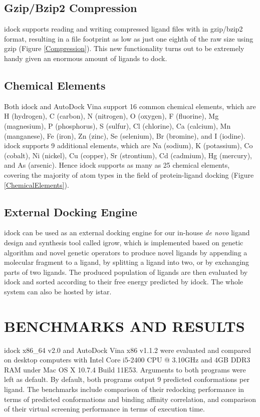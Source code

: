 \documentclass[12pt]{article}
\begin{document}
\subsection*{\sffamily \large Gzip/Bzip2 Compression}

idock supports reading and writing compressed ligand files with in gzip/bzip2 format, resulting in a file footprint as low as just one eighth of the raw size using gzip (Figure \ref{Compression}). This new functionality turns out to be extremely handy given an enormous amount of ligands to dock.

\subsection*{\sffamily \large Chemical Elements}

Both idock and AutoDock Vina support 16 common chemical elements, which are H (hydrogen), C (carbon), N (nitrogen), O (oxygen), F (fluorine), Mg (magnesium), P (phosphorus), S (sulfur), Cl (chlorine), Ca (calcium), Mn (manganese), Fe (iron), Zn (zinc), Se (selenium), Br (bromine), and I (iodine). idock supports 9 additional elements, which are Na (sodium), K (potassium), Co (cobalt), Ni (nickel), Cu (copper), Sr (strontium), Cd (cadmium), Hg (mercury), and As (arsenic). Hence idock supports as many as 25 chemical elements, covering the majority of atom types in the field of protein-ligand docking (Figure \ref{ChemicalElements}).

\subsection*{\sffamily \large External Docking Engine}

idock can be used as an external docking engine for our in-house \textit{de novo} ligand design and synthesis tool called igrow, which is implemented based on genetic algorithm and novel genetic operators to produce novel ligands by appending a molecular fragment to a ligand, by splitting a ligand into two, or by exchanging parts of two ligands. The produced population of ligands are then evaluated by idock and sorted according to their free energy predicted by idock. The whole system can also be hosted by istar.

\section*{\sffamily \Large BENCHMARKS AND RESULTS}

idock x86\_64 v2.0 and AutoDock Vina x86 v1.1.2 were evaluated and compared on desktop computers with Intel Core i5-2400 CPU @ 3.10GHz and 4GB DDR3 RAM under Mac OS X 10.7.4 Build 11E53. Arguments to both programs were left as default. By default, both programs output 9 predicted conformations per ligand. The benchmarks include comparison of their redocking performance in terms of predicted conformations and binding affinity correlation, and comparison of their virtual screening performance in terms of execution time.
\end{document}
